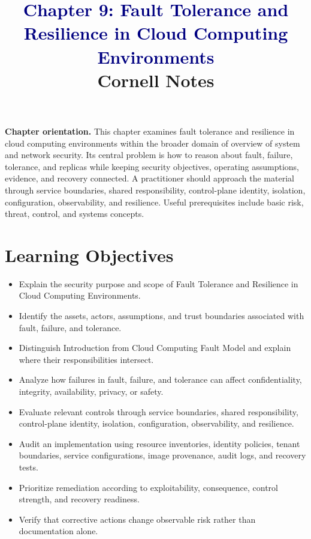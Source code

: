 \documentclass[11pt]{article}
\title{\textcolor{Navy}{Chapter 9: Fault Tolerance and Resilience in Cloud Computing Environments}\\[2mm]\large Cornell Notes}
\author{}
\date{}
\begin{document}
\maketitle
\thispagestyle{fancy}
\vspace{-1.5em}
\begin{orientationbox}
\textbf{Chapter orientation.} This chapter examines fault tolerance and resilience in cloud computing environments within the broader domain of overview of system and network security. Its central problem is how to reason about fault, failure, tolerance, and replicas while keeping security objectives, operating assumptions, evidence, and recovery connected. A practitioner should approach the material through service boundaries, shared responsibility, control-plane identity, isolation, configuration, observability, and resilience. Useful prerequisites include basic risk, threat, control, and systems concepts.
\end{orientationbox}
\section*{Learning Objectives}
\begin{itemize}
\item Explain the security purpose and scope of Fault Tolerance and Resilience in Cloud Computing Environments.
\item Identify the assets, actors, assumptions, and trust boundaries associated with fault, failure, and tolerance.
\item Distinguish Introduction from Cloud Computing Fault Model and explain where their responsibilities intersect.
\item Analyze how failures in fault, failure, and tolerance can affect confidentiality, integrity, availability, privacy, or safety.
\item Evaluate relevant controls through service boundaries, shared responsibility, control-plane identity, isolation, configuration, observability, and resilience.
\item Audit an implementation using resource inventories, identity policies, tenant boundaries, service configurations, image provenance, audit logs, and recovery tests.
\item Prioritize remediation according to exploitability, consequence, control strength, and recovery readiness.
\item Verify that corrective actions change observable risk rather than documentation alone.
\end{itemize}
\end{document}
